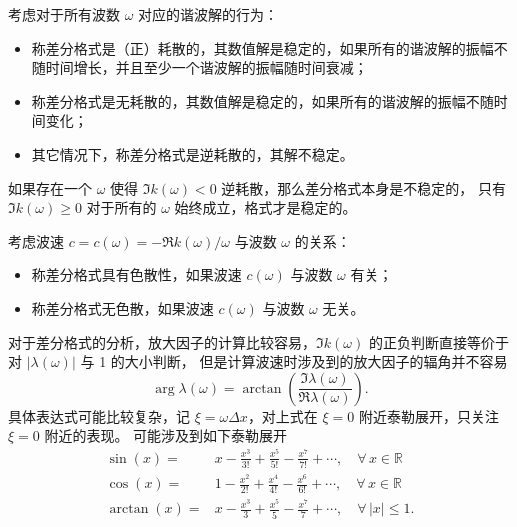 \begin{definition}[差分格式的耗散性]
    考虑对于所有波数 $\omega$ 对应的谐波解的行为：
    \begin{itemize}
        \item 称差分格式是（正）耗散的，其数值解是稳定的，如果所有的谐波解的振幅不随时间增长，并且至少一个谐波解的振幅随时间衰减；
        \item 称差分格式是无耗散的，其数值解是稳定的，如果所有的谐波解的振幅不随时间变化；
        \item 其它情况下，称差分格式是逆耗散的，其解不稳定。
    \end{itemize}
\end{definition}

\begin{remark}
    如果存在一个 $\omega$ 使得 $\Im k(\omega) < 0$ 逆耗散，那么差分格式本身是不稳定的，
    只有 $\Im k(\omega) \ge 0$ 对于所有的 $\omega$ 始终成立，格式才是稳定的。
\end{remark}

\begin{definition}[差分格式的色散性]
    考虑波速 $c = c(\omega) = - \Re k(\omega) / \omega$ 与波数 $\omega$ 的关系：
    \begin{itemize}
        \item 称差分格式具有色散性，如果波速 $c(\omega)$ 与波数 $\omega$ 有关；
        \item 称差分格式无色散，如果波速 $c(\omega)$ 与波数 $\omega$ 无关。
    \end{itemize}
\end{definition}

对于差分格式的分析，放大因子的计算比较容易，$\Im k(\omega)$ 的正负判断直接等价于对 $|\lambda(\omega)|$ 与 1 的大小判断，
但是计算波速时涉及到的放大因子的辐角并不容易
\[
    \arg \lambda(\omega) = \arctan \left(\frac{\Im \lambda(\omega)}{\Re \lambda(\omega)}\right).
\]
具体表达式可能比较复杂，记 $\xi = \omega \Delta x$，对上式在 $\xi = 0$ 附近泰勒展开，只关注 $\xi = 0$ 附近的表现。
可能涉及到如下泰勒展开
\begin{align*}
    \sin(x) ={}    & x - \frac{x^3}{3!} + \frac{x^5}{5!} - \frac{x^7}{7!} + \cdots, \quad \forall\, x \in \mathbb{R}  \\
    \cos(x) ={}    & 1 - \frac{x^2}{2!} + \frac{x^4}{4!} - \frac{x^6}{6!} + \cdots, \quad \forall\, x  \in \mathbb{R} \\
    \arctan(x) ={} & x - \frac{x^3}{3} + \frac{x^5}{5} - \frac{x^7}{7} + \cdots, \quad \forall\, |x| \le 1.
\end{align*}

